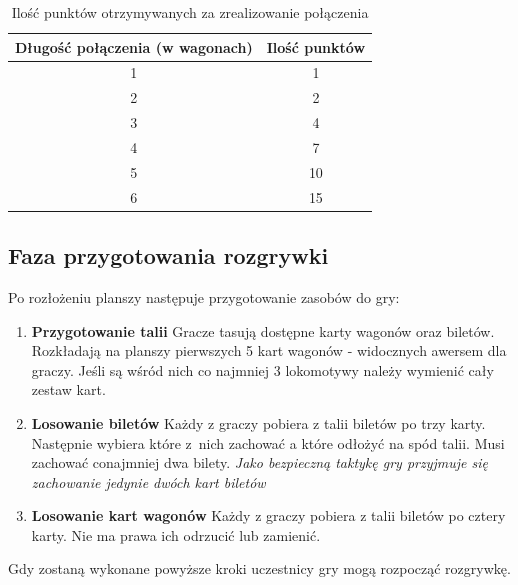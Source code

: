 \documentclass[12pt, oneside]{report}
\begin{document}
	\begin{table}[h]
		\begin{center}
			\begin{tabular}{|c|c|} \hline
				\textbf{Długość połączenia} (w wagonach) & \textbf{Ilość punktów} \\ \hline
				1 & 1 \\ \hline
				2 & 2 \\ \hline
				3 & 4 \\ \hline
				4 & 7 \\ \hline
				5 & 10 \\ \hline
				6 & 15 \\ \hline
			\end{tabular}	
			\caption{Ilość punktów otrzymywanych za zrealizowanie połączenia}
			\label{table:points}
		\end{center}
		
	\end{table}
	
	\subsection{Faza przygotowania rozgrywki}
	Po rozłożeniu planszy następuje przygotowanie zasobów do gry:
	\begin{enumerate}
		\item \textbf{Przygotowanie talii}
		\subitem Gracze tasują dostępne karty wagonów oraz biletów. Rozkładają na planszy pierwszych 5 kart wagonów - widocznych awersem dla graczy. Jeśli są wśród nich co najmniej 3 lokomotywy należy wymienić cały zestaw kart.
		\item \textbf{Losowanie biletów}
		\subitem Każdy z graczy pobiera z talii biletów po trzy karty. Następnie wybiera które z~nich zachować a które odłożyć na spód talii. Musi zachować conajmniej dwa bilety. \textit{Jako bezpieczną taktykę gry przyjmuje się zachowanie jedynie dwóch kart biletów}
		\item \textbf{Losowanie kart wagonów}
		\subitem Każdy z graczy pobiera z talii biletów po cztery karty. Nie ma prawa ich odrzucić lub zamienić.
	\end{enumerate}
	Gdy zostaną wykonane powyższe kroki uczestnicy gry mogą rozpocząć rozgrywkę. 
\end{document}
